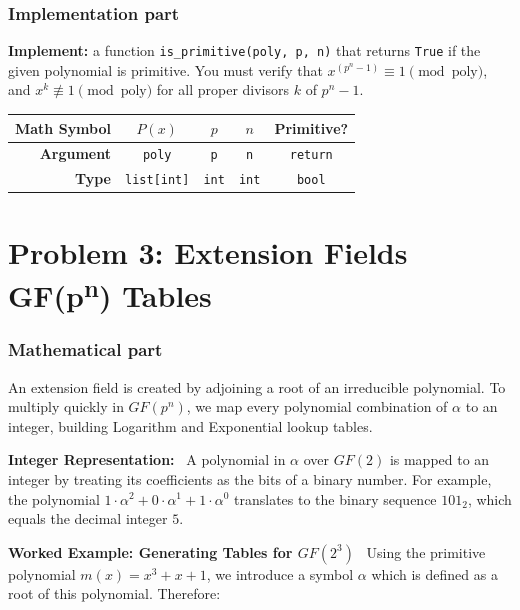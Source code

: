 \documentclass[11pt]{article}
\begin{document}
\subsubsection*{Implementation part}
\textbf{Implement:} a function \lstinline|is_primitive(poly, p, n)| that returns \lstinline|True| if the given polynomial is primitive. You must verify that $x^{(p^n - 1)} \equiv 1 \pmod{\text{poly}}$, and $x^k \not\equiv 1 \pmod{\text{poly}}$ for all proper divisors $k$ of $p^n - 1$.

\begin{center}
\renewcommand{\arraystretch}{2.0}
\begin{tabular}{r | c | c | c | c}
\toprule
\textbf{Math Symbol} & $P(x)$ & $p$ & $n$ & Primitive? \\ \midrule
\textbf{Argument} & \lstinline|poly| & \lstinline|p| & \lstinline|n| & \lstinline|return| \\ \midrule
\textbf{Type} & \lstinline|list[int]| & \lstinline|int| & \lstinline|int| & \lstinline|bool| \\
\bottomrule
\end{tabular}
\end{center}





\section*{Problem 3: Extension Fields GF(p\textsuperscript{n}) Tables}

\subsubsection*{Mathematical part}
An extension field is created by adjoining a root of an irreducible polynomial. To multiply quickly in $GF(p^n)$, we map every polynomial combination of $\alpha$ to an integer, building Logarithm and Exponential lookup tables.

\textbf{Integer Representation:} \
A polynomial in $\alpha$ over $GF(2)$ is mapped to an integer by treating its coefficients as the bits of a binary number. For example, the polynomial $1\cdot\alpha^2 + 0\cdot\alpha^1 + 1\cdot\alpha^0$ translates to the binary sequence $101_2$, which equals the decimal integer $5$.

\textbf{Worked Example: Generating Tables for $GF(2^3)$} \
Using the primitive polynomial $m(x)=x^3+x+1$, we introduce a symbol $\alpha$ which is defined as a root of this polynomial. Therefore:
\end{document}

